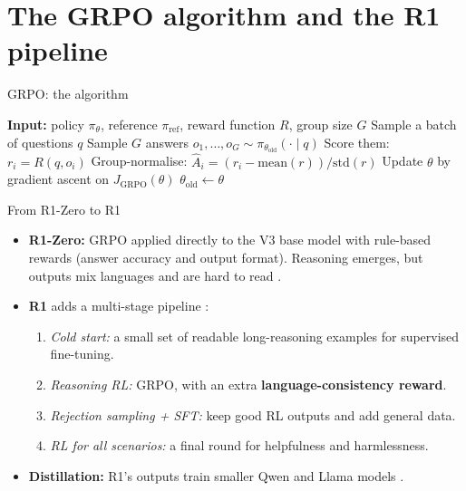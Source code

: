 \documentclass[xcolor=svgnames]{beamer}
\begin{document}
\section{The GRPO algorithm and the R1 pipeline}
\begin{frame}{GRPO: the algorithm}
\begin{algorithm}[H]
\caption{GRPO (simplified, after \cite{shao2024deepseekmath})}
\begin{algorithmic}[1]
\State \textbf{Input:} policy $\pi_\theta$, reference $\pi_{\text{ref}}$, reward function $R$, group size $G$
  \State Sample a batch of questions $q$
    \State Sample $G$ answers $o_1,\dots,o_G \sim \pi_{\theta_{\text{old}}}(\cdot \mid q)$
    \State Score them: $r_i = R(q, o_i)$
    \State Group-normalise: $\hat{A}_i = (r_i - \text{mean}(r))/\text{std}(r)$
  \EndFor
  \State Update $\theta$ by gradient ascent on $J_{\text{GRPO}}(\theta)$
  \State $\theta_{\text{old}} \gets \theta$
\EndFor
\end{algorithmic}
\end{algorithm}
\end{frame}

\begin{frame}{From R1-Zero to R1}
\begin{itemize}
  \item \textbf{R1-Zero:} GRPO applied directly to the V3 base model with rule-based rewards (answer accuracy and output format). Reasoning emerges, but outputs mix languages and are hard to read \cite{guo2025deepseekr1}.
  \item \textbf{R1} adds a multi-stage pipeline \cite{guo2025deepseekr1}:
  \begin{enumerate}
    \item \emph{Cold start:} a small set of readable long-reasoning examples for supervised fine-tuning.
    \item \emph{Reasoning RL:} GRPO, with an extra \textbf{language-consistency reward}.
    \item \emph{Rejection sampling + SFT:} keep good RL outputs and add general data.
    \item \emph{RL for all scenarios:} a final round for helpfulness and harmlessness.
  \end{enumerate}
  \item \textbf{Distillation:} R1's outputs train smaller Qwen and Llama models \cite{deepseekr1github}.
\end{itemize}
\end{frame}
\end{document}
